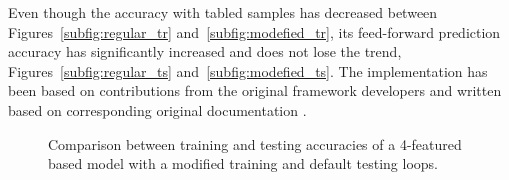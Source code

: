 Even though the accuracy with tabled samples has decreased between Figures~\ref{subfig:regular_tr} and~\ref{subfig:modefied_tr}, its feed-forward prediction accuracy has significantly increased and does not lose the trend, Figures~\ref{subfig:regular_ts} and~\ref{subfig:modefied_ts}.
The implementation has been based on contributions from the original framework developers \cite{time_2020} and written based on corresponding original documentation \cite{tensorflow2015-whitepaper}.
 {
\begin{figure}[!t]
    \centering
    \label{subfig:modefied_tr}
    \label{subfig:modefied_ts}
    \caption{Comparison between training and testing accuracies of a 4-featured based model with a modified training and default testing loops.}
    \label{fig:modefied_tr}
\end{figure}
}
